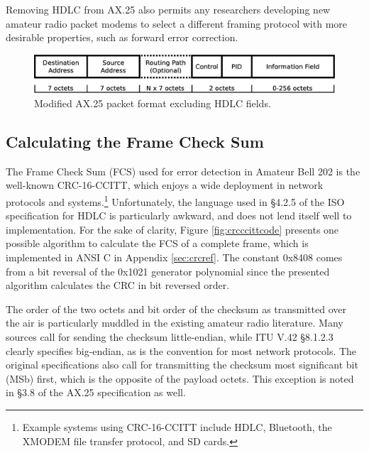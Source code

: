 Removing HDLC from AX.25 also permits any researchers developing new
amateur radio packet modems to select a different framing protocol
with more desirable properties, such as forward error correction.

\begin{figure}
	\centering
	\includegraphics[width=1.0\textwidth]{src/dia/ax25}
	\caption{Modified AX.25 packet format excluding HDLC fields.}
	\label{fig:ax25format}
\end{figure}

\subsection{Calculating the Frame Check Sum}
\label{calcfcs}


The Frame Check Sum (FCS) used for error detection in Amateur Bell 202
is the well-known CRC-16-CCITT, 
which enjoys a wide deployment in network protocols and 
systems.\footnote{Example systems using CRC-16-CCITT include HDLC, 
	Bluetooth, the XMODEM file 
transfer protocol, and SD cards.}
Unfortunately, the language used in \S4.2.5 of the ISO specification for
HDLC \cite{iso13239} is particularly awkward, 
and does not lend itself well to implementation.
For the sake of clarity, Figure \ref{fig:crcccittcode} 
presents one possible algorithm to
calculate the FCS of a complete frame, which is implemented in ANSI C in 
Appendix \ref{sec:crcref}.
The constant 0x8408 comes from a bit reversal of the 0x1021 generator polynomial
since the presented algorithm calculates the CRC in bit reversed order.

The order of the two octets and bit order of the checksum 
as transmitted over the air 
is particularly muddled in the existing amateur radio literature.
Many sources call for sending the
checksum little-endian, while ITU V.42 \S8.1.2.3 clearly specifies big-endian,
as is the convention for most network protocols.
The original specifications also call for transmitting the checksum most
significant bit (MSb) first, which is the opposite of the payload octets.
This exception is noted in \S3.8 of the AX.25 specification as well.


